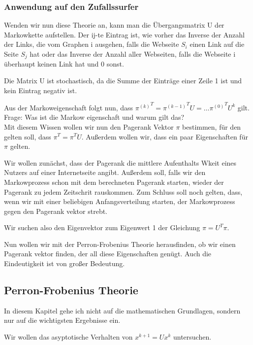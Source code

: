 \documentclass[]{article}
\begin{document}
\subsubsection{Anwendung auf den Zufallssurfer}
Wenden wir nun diese Theorie an, kann man die Übergangsmatrix U der Markowkette aufstellen. Der ij-te Eintrag ist, wie vorher das Inverse der Anzahl der Links, die vom Graphen i ausgehen, falls die Webseite $S_i$ einen Link auf die Seite $S_j$ hat oder das Inverse der Anzahl aller Webseiten, falls die Webseite i überhaupt keinen Link hat und 0 sonst. 

Die Matrix U ist stochastisch, da die Summe der Einträge einer Zeile 1 ist und kein Eintrag negativ ist. 

Aus der Markoweigenschaft folgt nun, dass ${\pi^{(k)}}^T= {\pi^{(k-1)}}^T U = \dots {\pi^{(0)}}^T U^k$ gilt. \\

Frage: Was ist die Markow eigenschaft und warum gilt das? \\

Mit diesem Wissen wollen wir nun den Pagerank Vektor $\pi$ bestimmen, für den gelten soll, dass $\pi^T = \pi^T U$. Außerdem wollen wir, dass ein paar Eigenschaften für $\pi$ gelten. 

Wir wollen zunächst, dass der Pagerank die mittlere Aufenthalts Wkeit eines Nutzers auf einer Internetseite angibt. Außerdem soll, falls wir den Markowprozess schon mit dem berechneten Pagerank starten, wieder der Pagerank zu jedem Zeitschrit rauskommen. Zum Schluss soll noch gelten, dass, wenn wir mit einer beliebigen Anfangsverteilung starten, der Markowprozess gegen den Pagerank vektor strebt. 

Wir suchen also den Eigenvektor zum Eigenwert 1 der Gleichung $\pi = U^T \pi$. 

Nun wollen wir mit der Perron-Frobenius Theorie herausfinden, ob wir einen Pagerank vektor finden, der all diese Eigenschaften genügt. Auch die Eindeutigkeit ist von großer Bedeutung.

\subsection{Perron-Frobenius Theorie}

In diesem Kapitel gehe ich nicht auf die mathematischen Grundlagen, sondern nur auf die wichtigsten Ergebnisse ein. 

Wir wollen das asyptotische Verhalten von $x^{k+1}=U x^k$ untersuchen. 
\end{document}
